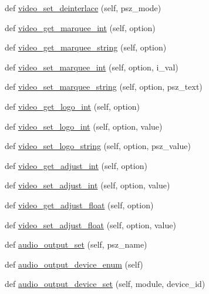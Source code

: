 \begin{DoxyCompactItemize}
\item 
def \hyperlink{classvlc_1_1_media_player_a7e7401a9ec141adb28bd0c1f5c53f6f6}{video\+\_\+set\+\_\+deinterlace} (self, psz\+\_\+mode)
\item 
def \hyperlink{classvlc_1_1_media_player_a3b08a7d4454fa62d9c4bb75351b04f71}{video\+\_\+get\+\_\+marquee\+\_\+int} (self, option)
\item 
def \hyperlink{classvlc_1_1_media_player_adbbb7771337a1484af090fa488d0a360}{video\+\_\+get\+\_\+marquee\+\_\+string} (self, option)
\item 
def \hyperlink{classvlc_1_1_media_player_a61a708bed378528147fee7cceb4c4143}{video\+\_\+set\+\_\+marquee\+\_\+int} (self, option, i\+\_\+val)
\item 
def \hyperlink{classvlc_1_1_media_player_a492db72b13ac08ae28e4672ca1e8fd92}{video\+\_\+set\+\_\+marquee\+\_\+string} (self, option, psz\+\_\+text)
\item 
def \hyperlink{classvlc_1_1_media_player_ab1dad98d088094f82a72ca5f6981e567}{video\+\_\+get\+\_\+logo\+\_\+int} (self, option)
\item 
def \hyperlink{classvlc_1_1_media_player_a869914b4d2104458d72b18ec78f08527}{video\+\_\+set\+\_\+logo\+\_\+int} (self, option, value)
\item 
def \hyperlink{classvlc_1_1_media_player_a3554b11f8402f4997f5f6fbed1b22bae}{video\+\_\+set\+\_\+logo\+\_\+string} (self, option, psz\+\_\+value)
\item 
def \hyperlink{classvlc_1_1_media_player_a8b9d77a54530a6a7ef9a686980c0d58b}{video\+\_\+get\+\_\+adjust\+\_\+int} (self, option)
\item 
def \hyperlink{classvlc_1_1_media_player_ad8f3725ce406170a3703805dae8733f1}{video\+\_\+set\+\_\+adjust\+\_\+int} (self, option, value)
\item 
def \hyperlink{classvlc_1_1_media_player_a91a961e8cb4b783a2042397f1bba6504}{video\+\_\+get\+\_\+adjust\+\_\+float} (self, option)
\item 
def \hyperlink{classvlc_1_1_media_player_a8961d32c677daf7be108038c183fb911}{video\+\_\+set\+\_\+adjust\+\_\+float} (self, option, value)
\item 
def \hyperlink{classvlc_1_1_media_player_afe8f532333eb1d961d285d3bb74df20c}{audio\+\_\+output\+\_\+set} (self, psz\+\_\+name)
\item 
def \hyperlink{classvlc_1_1_media_player_a8f936fa19d272b0c7bcf4916a0ddf095}{audio\+\_\+output\+\_\+device\+\_\+enum} (self)
\item 
def \hyperlink{classvlc_1_1_media_player_aa3acdfd10aed7948cf6d53a1d6f55660}{audio\+\_\+output\+\_\+device\+\_\+set} (self, module, device\+\_\+id)

\end{DoxyCompactItemize}
